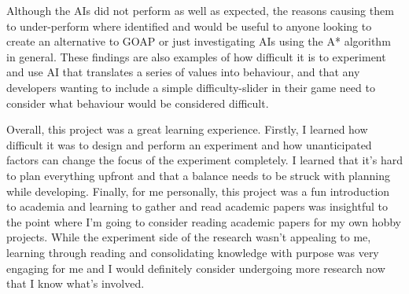 \documentclass[11pt, a4paper]{report}
\begin{document}
Although the AIs did not perform as well as expected, the reasons causing them to under-perform where identified and would be useful to anyone looking to create an alternative to GOAP or just investigating AIs using the A* algorithm in general. These findings are also examples of how difficult it is to experiment and use AI that translates a series of values into behaviour, and that any developers wanting to include a simple difficulty-slider in their game need to consider what behaviour would be considered difficult. 

Overall, this project was a great learning experience. Firstly, I learned how difficult it was to design and perform an experiment and how unanticipated factors can change the focus of the experiment completely. I learned that it's hard to plan everything upfront and that a balance needs to be struck with planning while developing. Finally, for me personally, this project was a fun introduction to academia and learning to gather and read academic papers was insightful to the point where I'm going to consider reading academic papers for my own hobby projects. While the experiment side of the research wasn't appealing to me, learning through reading and consolidating knowledge with purpose was very engaging for me and I would definitely consider undergoing more research now that I know what's involved.

\cleardoublepage
\printbibliography[
  heading=bibintoc,
  title={Bibliography}
]
\end{document}
